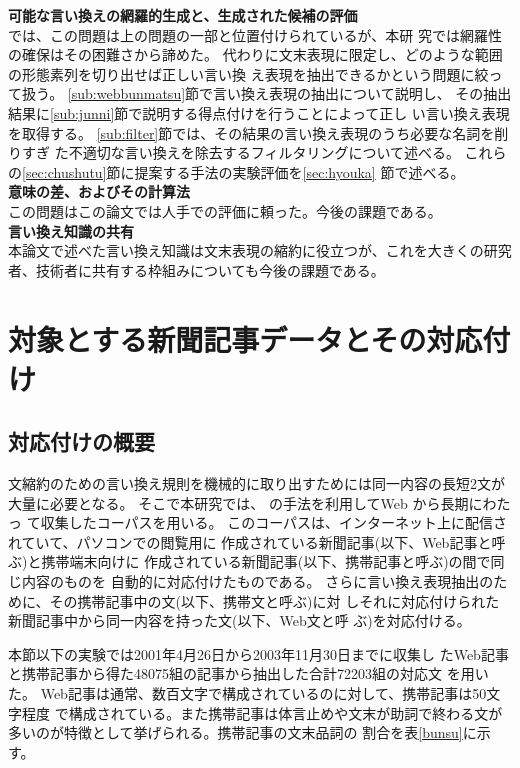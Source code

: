 \documentclass[jnlpbbl]{jnlp_j}
\begin{document}
\noindent \textbf{可能な言い換えの網羅的生成と、生成された候補の評価}\\
\cite{inui02}では、この問題は上の問題の一部と位置付けられているが、本研
究では網羅性の確保はその困難さから諦めた。
代わりに文末表現に限定し、どのような範囲の形態素列を切り出せば正しい言い換
え表現を抽出できるかという問題に絞って扱う。
\ref{sub:webbunmatsu}節で言い換え表現の抽出について説明し、
その抽出結果に\ref{sub:junni}節で説明する得点付けを行うことによって正し
い言い換え表現を取得する。
\ref{sub:filter}節では、その結果の言い換え表現のうち必要な名詞を削りすぎ
た不適切な言い換えを除去するフィルタリングについて述べる。
これらの\ref{sec:chushutu}節に提案する手法の実験評価を\ref{sec:hyouka}
節で述べる。
\\

\noindent \textbf{意味の差、およびその計算法}\\
この問題はこの論文では人手での評価に頼った。今後の課題である。
\\

\noindent \textbf{言い換え知識の共有}\\
本論文で述べた言い換え知識は文末表現の縮約に役立つが、これを大きくの研究
者、技術者に共有する枠組みについても今後の課題である。


\section{対象とする新聞記事データとその対応付け} \label{sec:taiou}

\subsection{対応付けの概要}

文縮約のための言い換え規則を機械的に取り出すためには同一内容の長短2文が
大量に必要となる。
そこで本研究では、\cite{oomori03} の手法を利用してWeb から長期にわたっ
て収集したコーパスを用いる。
このコーパスは、インターネット上に配信されていて、パソコンでの閲覧用に
作成されている新聞記事(以下、Web記事と呼ぶ)と携帯端末向けに
作成されている新聞記事(以下、携帯記事と呼ぶ)の間で同じ内容のものを
自動的に対応付けたものである。
さらに言い換え表現抽出のために、その携帯記事中の文(以下、携帯文と呼ぶ)に対
しそれに対応付けられた新聞記事中から同一内容を持った文(以下、Web文と呼
ぶ)を対応付ける\cite{sato04}。

本節以下の実験では2001年4月26日から2003年11月30日までに収集し
たWeb記事と携帯記事から得た48075組の記事から抽出した合計72203組の対応文
を用いた。
Web記事は通常、数百文字で構成されているのに対して、携帯記事は50文字程度
で構成されている。また携帯記事は体言止めや文末が助詞で終わる文が
多いのが特徴として挙げられる。携帯記事の文末品詞の
割合を表\ref{bunsu}に示す。
\end{document}
